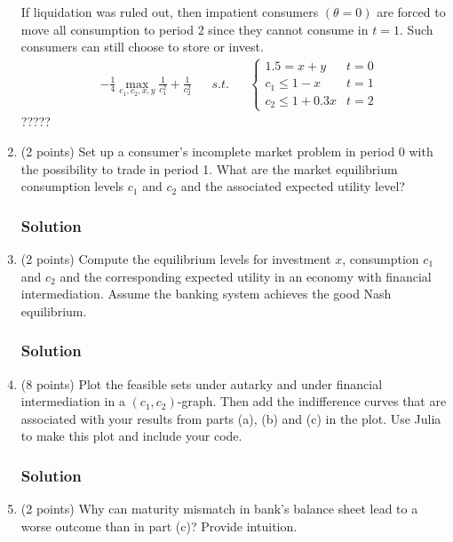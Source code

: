 \documentclass[12pt]{article}
\begin{document}
\begin{enumerate}[label=(\alph*)]
    If liquidation was ruled out, then impatient consumers $(\theta=0)$ are forced to move all consumption to period 2 since they cannot consume in $t=1.$ Such consumers can still choose to store or invest.
    \begin{align*}
        &-\frac{1}{4}\max_{c_1, c_2, x,y} \frac{1}{c_{1}^{2}}+\frac{1}{c_{2}^{2}}  && s.t. && \begin{cases}
             1.5 =x+y & t=0
            \\ c_1 \leq 1-x  & t=1
            \\ c_2 \leq 1+0.3x & t=2
        \end{cases}
    \end{align*}?????
    
    
    \item (2 points) Set up a consumer’s incomplete market problem in period 0 with the possibility to trade in period 1. What are the market equilibrium consumption levels $c_1$ and $c_2$ and the associated expected utility level?
\subsubsection*{Solution}



    \item (2 points) Compute the equilibrium levels for investment $x$, consumption $c_1$ and $c_2$ and the corresponding expected utility in an economy with financial intermediation. Assume the banking system achieves the good Nash equilibrium.
\subsubsection*{Solution}



    \item (8 points) Plot the feasible sets under autarky and under financial intermediation in a $(c_1, c_2)$-graph. Then add the indifference curves that are associated with your results from parts (a), (b) and (c) in the plot. Use Julia to make this plot and include your code.
\subsubsection*{Solution}



    \item (2 points) Why can maturity mismatch in bank’s balance sheet lead to a worse outcome than in part (c)? Provide intuition.

\end{enumerate}
\end{document}
